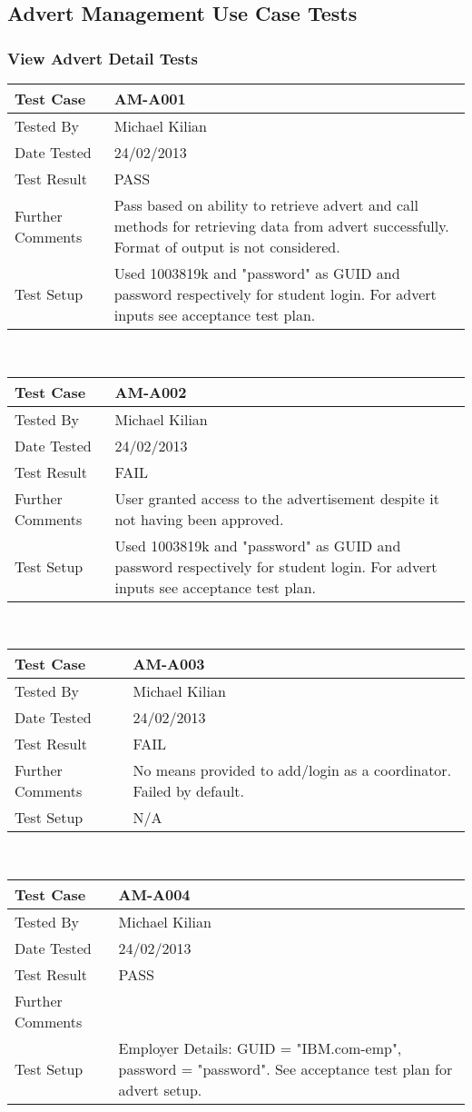 \documentclass{l3deliverable}
\begin{document}
\newpage

\subsection{Advert Management Use Case Tests}

\subsubsection{View Advert Detail Tests}
\begin{tabular}{lp{10cm}}
\hline 
\textbf{Test Case} & AM-A001\tabularnewline
\hline 
\hline 
Tested By & Michael Kilian\tabularnewline
\hline 
Date Tested & 24/02/2013\tabularnewline
\hline 
Test Result & PASS\tabularnewline
\hline
Further Comments & Pass based on ability to retrieve advert and call methods for retrieving data from advert successfully. Format of output is not considered. \tabularnewline
\hline
Test Setup & Used 1003819k and "password" as GUID and password respectively for student login. For advert inputs see acceptance test plan. \tabularnewline
\hline
\end{tabular}\\

\begin{tabular}{lp{10cm}}
\hline 
\textbf{Test Case} & AM-A002\tabularnewline
\hline 
\hline 
Tested By & Michael Kilian\tabularnewline
\hline 
Date Tested & 24/02/2013\tabularnewline
\hline 
Test Result & FAIL\tabularnewline
\hline
Further Comments & User granted access to the advertisement despite it not having been approved.\tabularnewline
\hline
Test Setup & Used 1003819k and "password" as GUID and password respectively for student login. For advert inputs see acceptance test plan. \tabularnewline
\hline
\end{tabular}\\

\begin{tabular}{lp{10cm}}
\hline 
\textbf{Test Case} & AM-A003\tabularnewline
\hline 
\hline 
Tested By & Michael Kilian\tabularnewline
\hline 
Date Tested & 24/02/2013\tabularnewline
\hline 
Test Result & FAIL\tabularnewline
\hline
Further Comments & No means provided to add/login as a coordinator. Failed by default.\tabularnewline
\hline
Test Setup & N/A \tabularnewline
\hline
\end{tabular}\\

\begin{tabular}{lp{10cm}}
\hline 
\textbf{Test Case} & AM-A004\tabularnewline
\hline 
\hline 
Tested By & Michael Kilian\tabularnewline
\hline 
Date Tested & 24/02/2013\tabularnewline
\hline 
Test Result & PASS\tabularnewline
\hline
Further Comments & \tabularnewline
\hline
Test Setup & Employer Details: GUID = "IBM.com-emp", password = "password". See acceptance test plan for advert setup.\tabularnewline
\hline
\end{tabular}\\
\end{document}
